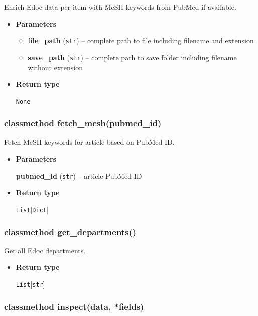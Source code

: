Enrich Edoc data per item with MeSH keywords from PubMed if available.

\begin{itemize}
\item
  \textbf{Parameters}

  \begin{itemize}
  \item
    \textbf{file\_path} (\texttt{str}) -- complete path to file
    including filename and extension
  \item
    \textbf{save\_path} (\texttt{str}) -- complete path to save folder
    including filename without extension
  \end{itemize}
\item
  \textbf{Return type}

  \texttt{None}
\end{itemize}

\hypertarget{classmethod-fetch_meshpubmed_id}{%
\subsubsection{classmethod
fetch\_mesh(pubmed\_id)}\label{classmethod-fetch_meshpubmed_id}}

Fetch MeSH keywords for article based on PubMed ID.

\begin{itemize}
\item
  \textbf{Parameters}

  \textbf{pubmed\_id} (\texttt{str}) -- article PubMed ID
\item
  \textbf{Return type}

  \texttt{List}{[}\texttt{Dict}{]}
\end{itemize}

\hypertarget{classmethod-get_departments}{%
\subsubsection{classmethod
get\_departments()}\label{classmethod-get_departments}}

Get all Edoc departments.

\begin{itemize}
\item
  \textbf{Return type}

  \texttt{List}{[}\texttt{str}{]}
\end{itemize}

\hypertarget{classmethod-inspectdata-fields}{%
\subsubsection{classmethod inspect(data,
*fields)}\label{classmethod-inspectdata-fields}}

